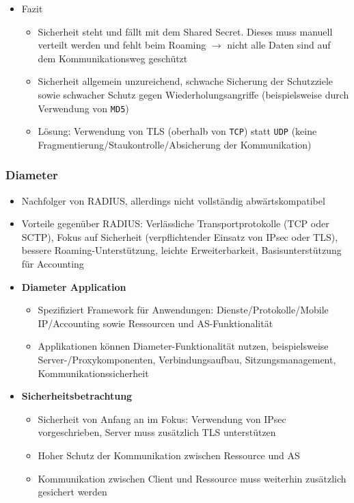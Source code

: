 \begin{itemize}
\begin{itemize}
		\item Fazit
		\begin{itemize}
			\item Sicherheit steht und fällt mit dem Shared Secret. Dieses muss manuell verteilt werden und fehlt beim Roaming \(\rightarrow\) nicht alle Daten sind auf dem Kommunikationsweg geschützt
			\item Sicherheit allgemein unzureichend, schwache Sicherung der Schutzziele sowie schwacher Schutz gegen Wiederholungsangriffe (beispielsweise durch Verwendung von \texttt{MD5})
			\item Lösung: Verwendung von TLS (oberhalb von \texttt{TCP}) statt \texttt{UDP} (keine Fragmentierung/Staukontrolle/Absicherung der Kommunikation)
		\end{itemize}
	\end{itemize}
\end{itemize}

\subsubsection{Diameter}
\begin{itemize}
	\item Nachfolger von RADIUS, allerdings nicht vollständig abwärtskompatibel
	\item Vorteile gegenüber RADIUS: Verlässliche Transportprotokolle (TCP oder SCTP), Fokus auf Sicherheit (verpflichtender Einsatz von IPsec oder TLS), bessere Roaming-Unterstützung, leichte Erweiterbarkeit, Basisunterstützung für Accounting
	\item \textbf{Diameter Application}
	\begin{itemize}
		\item Spezifiziert Framework für Anwendungen: Dienste/Protokolle/Mobile IP/Accounting sowie Ressourcen und AS-Funktionalität
		\item Applikationen können Diameter-Funktionalität nutzen, beispielsweise Server-/Proxykomponenten, Verbindungsaufbau, Sitzungsmanagement, Kommunikationssicherheit
	\end{itemize}
	\item \textbf{Sicherheitsbetrachtung}
	\begin{itemize}
		\item Sicherheit von Anfang an im Fokus: Verwendung von IPsec vorgeschrieben, Server muss zusätzlich TLS unterstützen
		\item Hoher Schutz der Kommunikation zwischen Ressource und AS
		\item Kommunikation zwischen Client und Ressource muss weiterhin zusätzlich gesichert werden
	\end{itemize}
\end{itemize}



